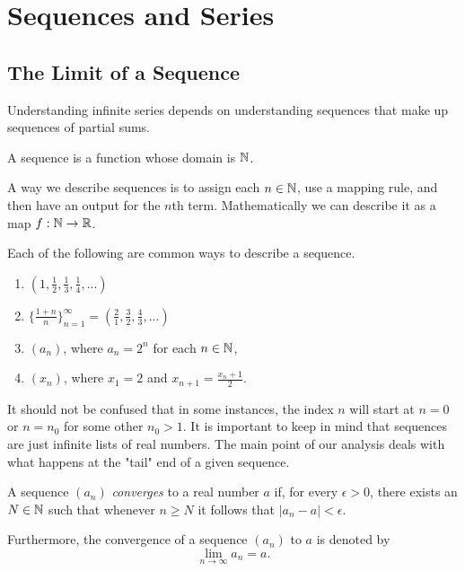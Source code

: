 \chapter{Sequences and Series}

\section{The Limit of a Sequence}

Understanding infinite series depends on understanding sequences that make up sequences of partial sums.

\begin{tcolorbox}
\begin{defn}
A sequence is a function whose domain is \( \mathbb{N} \).
\end{defn}
\end{tcolorbox}

A way we describe sequences is to assign each \( n \in \mathbb{N} \), use a mapping rule, and then have an output for the \( n \)th term. Mathematically we can describe it as a map \( f: \mathbb{N} \to \mathbb{R} \).

\begin{ex}
    Each of the following are common ways to describe a sequence. 
    \begin{enumerate}
        \item \( (1, \frac{1}{2},  \frac{1}{3}, \frac{1}{4},...  )\)
        \item \( \{  \frac{1+n}{n}  \}_{n=1}^{ \infty} = ( \frac{2}{1}, \frac{3}{2}, \frac{4}{3}, ...)\)
        \item \( (a_n) \), where \( a_n = 2^n \) for each \( n \in \mathbb{N} \),
        \item \( (x_n)\), where \( x_1 = 2 \) and \( x_{n+1} = \frac{x_n + 1 }{2}\).
    \end{enumerate}
\end{ex}
It should not be confused that in some instances, the index \( n \) will start at \( n = 0 \) or \( n = n_0 \) for some other \( n_0 > 1 \). It is important to keep in mind that sequences are just infinite lists of real numbers. The main point of our analysis deals with what happens at the "tail" end of a given sequence. 

\begin{tcolorbox}
\begin{defn}
A sequence \( (a_n) \) \textit{converges} to a real number \( a \) if, for every \( \epsilon > 0 \), there exists an \( N \in \mathbb{N} \) such that whenever \( n \geq N \) it follows that \( |a_n - a | < \epsilon \).
\end{defn}
\end{tcolorbox}
Furthermore, the convergence of a sequence \( (a_n) \) to \( a \) is denoted by 
\[ \lim_{n \to \infty} a_n = a.\]

